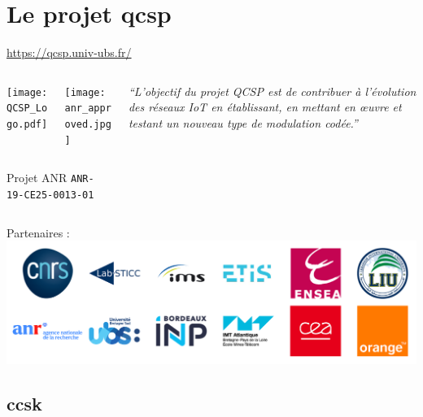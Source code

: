 \documentclass[../main.tex]{subfiles}
\begin{document}
\section[\acrshort{qcsp}]{Le projet \acrfull{qcsp}}

\begin{frame}{\secname}{\href{https://qcsp.univ-ubs.fr/}{https://qcsp.univ-ubs.fr/}}

  \begin{columns}
    \begin{column}{.4\linewidth} \centering
      \begin{columns}
        \begin{column}{.4\linewidth}
          \texttt{[image: QCSP\_Logo.pdf]}
        \end{column}
        \begin{column}{.2\linewidth}
          \texttt{[image: anr\_approved.jpg]}
        \end{column}
      \end{columns}
      \small \vspace{5pt} Projet ANR \texttt{ANR-19-CE25-0013-01}
    \end{column}
    \begin{column}{.5\linewidth}
      \emph{``L'objectif du projet QCSP est de contribuer à l'évolution des réseaux IoT en établissant,
        en mettant en œuvre et testant un nouveau type de modulation codée.''}
    \end{column}
  \end{columns}

  \vspace{2 em}

  \begin{center}
    Partenaires :\\
    \includegraphics[width=0.6\linewidth]{figures/logos-thesis/partners-logos.png}
  \end{center}
\end{frame}


\subsection[\acrshort{ccsk}]{\acrfull{ccsk}}
\end{document}
